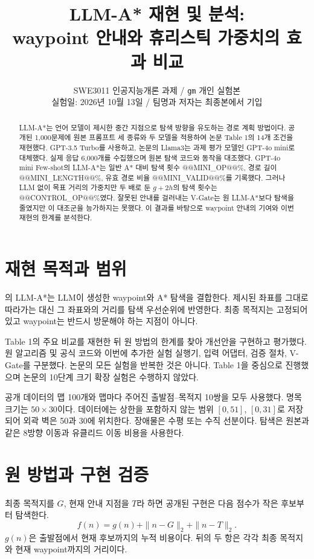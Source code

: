 \documentclass[11pt]{article}
\title{LLM-A* 재현 및 분석:\protect\\waypoint 안내와 휴리스틱 가중치의 효과 비교}
\author{SWE3011 인공지능개론 과제 / \texttt{gm} 개인 실험본\\
실험일: 2026년 10월 13일 / 팀명과 저자는 최종본에서 기입}
\begin{document}
\maketitle
\begin{abstract}
LLM-A*는 언어 모델이 제시한 중간 지점으로 탐색 방향을 유도하는 경로 계획 방법이다. 공개된 1,000문제에 원본 프롬프트 세 종류와 두 모델을 적용하여 논문 Table 1의 14개 조건을 재현했다. GPT-3.5 Turbo를 사용하고, 논문의 Llama3는 과제 평가 모델인 GPT-4o mini로 대체했다. 실제 응답 6,000개를 수집했으며 원본 탐색 코드와 동작을 대조했다. GPT-4o mini Few-shot의 LLM-A*는 일반 A* 대비 탐색 횟수 @@MINI_OP@@\%, 경로 길이 @@MINI_LENGTH@@\%, 유효 경로 비율 @@MINI_VALID@@\%를 기록했다. 그러나 LLM 없이 목표 거리의 가중치만 두 배로 둔 $g+2h$의 탐색 횟수는 @@CONTROL_OP@@\%였다. 잘못된 안내를 걸러내는 V-Gate는 원 LLM-A*보다 탐색을 줄였지만 이 대조군을 능가하지는 못했다. 이 결과를 바탕으로 waypoint 안내의 기여와 이번 재현의 한계를 분석한다.
\end{abstract}

\section{재현 목적과 범위}
\citet{meng2025}의 LLM-A*는 LLM이 생성한 waypoint와 A* 탐색을 결합한다. 제시된 좌표를 그대로 따라가는 대신 그 좌표와의 거리를 탐색 우선순위에 반영한다. 최종 목적지는 고정되어 있고 waypoint는 반드시 방문해야 하는 지점이 아니다.

Table 1의 주요 비교를 재현한 뒤 원 방법의 한계를 찾아 개선안을 구현하고 평가했다. 원 알고리즘 및 공식 코드와 이번에 추가한 실험 실행기, 입력 어댑터, 검증 절차, V-Gate를 구분했다. 논문의 모든 실험을 반복한 것은 아니다. Table 1을 중심으로 진행했으며 논문의 10단계 크기 확장 실험은 수행하지 않았다.

공개 데이터의 맵 100개와 맵마다 주어진 출발점--목적지 10쌍을 모두 사용했다. 명목 크기는 $50\times30$이다. 데이터에는 상한을 포함하지 않는 범위 $[0,51]$, $[0,31]$로 저장되어 외곽 벽은 50과 30에 위치한다. 장애물은 수평 또는 수직 선분이다. 탐색은 원본과 같은 8방향 이동과 유클리드 이동 비용을 사용한다.

\section{원 방법과 구현 검증}
최종 목적지를 $G$, 현재 안내 지점을 $T$라 하면 공개된 구현은 다음 점수가 작은 후보부터 탐색한다.
\begin{equation}
 f(n)=g(n)+\|n-G\|_2+\|n-T\|_2.
\end{equation}
$g(n)$은 출발점에서 현재 후보까지의 누적 비용이다. 뒤의 두 항은 각각 최종 목적지와 현재 waypoint까지의 거리이다.
\end{document}
